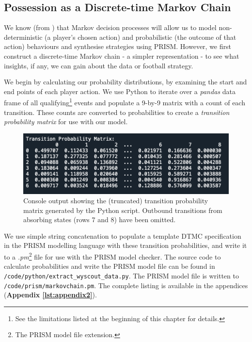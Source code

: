 \documentclass{l4proj}
\begin{document}
\subsection{Possession as a Discrete-time Markov Chain}

We know (from \cite{fac2}) that Markov decision processes will allow us to model non-deterministic (a player's chosen action) and probabilistic (the outcome of that action) behaviours and synthesise strategies using PRISM. However, we first construct a discrete-time Markov chain - a simpler representation - to see what insights, if any, we can gain about the data or football strategy.

We begin by calculating our probability distributions, by examining the start and end points of each player action. We use Python to iterate over a \textit{pandas} data frame of all qualifying\footnote{See the limitations listed at the beginning of this chapter for details.} events and populate a 9-by-9 matrix with a count of each transition. These counts are converted to probabilities to create a \textit{transition probability matrix} for use with our model.

\begin{figure}[h]
    \centering
    \includegraphics[scale=0.6]{images/probmat.png}   
    \caption{Console output showing the (truncated) transition probability matrix generated by the Python script. Outbound transitions from absorbing states (rows 7 and 8) have been omitted.}
    \label{fig:probmat} 
\end{figure}

We use simple string concatenation to populate a template DTMC specification in the PRISM modelling language with these transition probabilities, and write it to a \textit{.pm}\footnote{The PRISM model file extension.} file for use with the PRISM model checker. The source code to calculate probabilities and write the PRISM model file can be found in \texttt{/code/python/extract\_wyscout\_data.py}. The PRISM model file is written to \texttt{/code/prism/markovchain.pm}. The complete listing is available in the appendices (\textbf{Appendix \ref{lst:appendix2}}).
\end{document}
